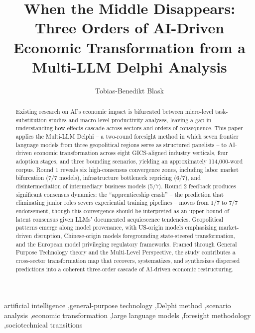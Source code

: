 \documentclass[preprint,review,12pt]{elsarticle}
\begin{document}
\begin{frontmatter}

\title{When the Middle Disappears: Three Orders of AI-Driven Economic Transformation from a Multi-LLM Delphi Analysis}

\author[hsharz]{Tobias-Benedikt Blask}

\address[hsharz]{Harz University of Applied Sciences, Wernigerode, Germany}

\begin{abstract}
Existing research on AI's economic impact is bifurcated between micro-level task-substitution studies and macro-level productivity analyses, leaving a gap in understanding how effects cascade across sectors and orders of consequence. This paper applies the Multi-LLM Delphi -- a two-round foresight method in which seven frontier language models from three geopolitical regions serve as structured panelists -- to AI-driven economic transformation across eight GICS-aligned industry verticals, four adoption stages, and three bounding scenarios, yielding an approximately 114,000-word corpus. Round 1 reveals six high-consensus convergence zones, including labor market bifurcation (7/7 models), infrastructure bottleneck repricing (6/7), and disintermediation of intermediary business models (5/7). Round 2 feedback produces significant consensus dynamics: the ``apprenticeship crash'' -- the prediction that eliminating junior roles severs experiential training pipelines -- moves from 1/7 to 7/7 endorsement, though this convergence should be interpreted as an upper bound of latent consensus given LLMs' documented acquiescence tendencies. Geopolitical patterns emerge along model provenance, with US-origin models emphasizing market-driven disruption, Chinese-origin models foregrounding state-steered transformation, and the European model privileging regulatory frameworks. Framed through General Purpose Technology theory and the Multi-Level Perspective, the study contributes a cross-sector transformation map that recovers, systematizes, and synthesizes dispersed predictions into a coherent three-order cascade of AI-driven economic restructuring.
\end{abstract}

\begin{keyword}
artificial intelligence \sep general-purpose technology \sep Delphi method \sep scenario analysis \sep economic transformation \sep large language models \sep foresight methodology \sep sociotechnical transitions
\end{keyword}

\end{frontmatter}
\end{document}
